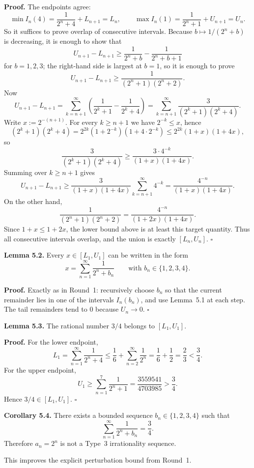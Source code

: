 \medskip
\noindent
\textbf{Proof.}
The endpoints agree:
\[
\min I_n(4)=\frac{1}{2^n+4}+L_{n+1}=L_n,
\qquad
\max I_n(1)=\frac{1}{2^n+1}+U_{n+1}=U_n.
\]
So it suffices to prove overlap of consecutive intervals.
Because $b\mapsto 1/(2^n+b)$ is decreasing, it is enough to show that
\[
U_{n+1}-L_{n+1}\ge
\frac{1}{2^n+b}-\frac{1}{2^n+b+1}
\]
for $b=1,2,3$; the right-hand side is largest at $b=1$, so it is enough to prove
\[
U_{n+1}-L_{n+1}\ge \frac{1}{(2^n+1)(2^n+2)}.
\]
Now
\[
U_{n+1}-L_{n+1}
=\sum_{k=n+1}^{\infty}\left(\frac{1}{2^k+1}-\frac{1}{2^k+4}\right)
=\sum_{k=n+1}^{\infty}\frac{3}{(2^k+1)(2^k+4)}.
\]
Write $x:=2^{-(n+1)}$.  For every $k\ge n+1$ we have $2^{-k}\le x$, hence
\[
(2^k+1)(2^k+4)
=2^{2k}(1+2^{-k})(1+4\cdot 2^{-k})
\le 2^{2k}(1+x)(1+4x),
\]
so
\[
\frac{3}{(2^k+1)(2^k+4)}
\ge \frac{3\cdot 4^{-k}}{(1+x)(1+4x)}.
\]
Summing over $k\ge n+1$ gives
\[
U_{n+1}-L_{n+1}
\ge \frac{3}{(1+x)(1+4x)}\sum_{k=n+1}^{\infty}4^{-k}
=\frac{4^{-n}}{(1+x)(1+4x)}.
\]
On the other hand,
\[
\frac{1}{(2^n+1)(2^n+2)}
=\frac{4^{-n}}{(1+2x)(1+4x)}.
\]
Since $1+x\le 1+2x$, the lower bound above is at least this target quantity.  Thus all consecutive intervals overlap, and the union is exactly $[L_n,U_n]$.
\hfill $\square$

\medskip
\noindent
\textbf{Lemma 5.2.}
Every $x\in [L_1,U_1]$ can be written in the form
\[
x=\sum_{n=1}^{\infty}\frac{1}{2^n+b_n}
\qquad\mbox{with } b_n\in\{1,2,3,4\}.
\]

\medskip
\noindent
\textbf{Proof.}
Exactly as in Round~1: recursively choose $b_n$ so that the current remainder lies in one of the intervals $I_n(b_n)$, and use Lemma~5.1 at each step.  The tail remainders tend to $0$ because $U_n\to 0$.
\hfill $\square$

\medskip
\noindent
\textbf{Lemma 5.3.}
The rational number $3/4$ belongs to $[L_1,U_1]$.

\medskip
\noindent
\textbf{Proof.}
For the lower endpoint,
\[
L_1=\sum_{n=1}^{\infty}\frac{1}{2^n+4}
\le \frac16+\sum_{n=2}^{\infty}\frac{1}{2^n}
=\frac16+\frac12=\frac23<\frac34.
\]
For the upper endpoint,
\[
U_1\ge \sum_{n=1}^{7}\frac{1}{2^n+1}
=\frac{3559541}{4703985}>\frac34.
\]
Hence $3/4\in[L_1,U_1]$.
\hfill $\square$

\medskip
\noindent
\textbf{Corollary 5.4.}
There exists a bounded sequence $b_n\in\{1,2,3,4\}$ such that
\[
\sum_{n=1}^{\infty}\frac{1}{2^n+b_n}=\frac34.
\]
Therefore $a_n=2^n$ is not a Type~3 irrationality sequence.

\medskip
This improves the explicit perturbation bound from Round~1.

